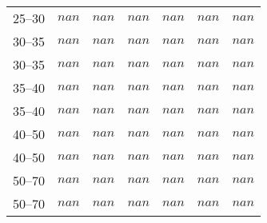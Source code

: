\documentclass{article}
\begin{document}
\begin{table}[!h]
\begin{tabular}{|c|cccccc|}
25--30   &  $nan$  & $nan$  &  $nan$ &  $nan$  & $nan$  &  $nan$ \\
30--35   &  $nan$  & $nan$  &  $nan$ &  $nan$  & $nan$  &  $nan$ \\
30--35   &  $nan$  & $nan$  &  $nan$ &  $nan$  & $nan$  &  $nan$ \\
35--40   &  $nan$  & $nan$  &  $nan$ &  $nan$  & $nan$  &  $nan$ \\
35--40   &  $nan$  & $nan$  &  $nan$ &  $nan$  & $nan$  &  $nan$ \\
40--50   &  $nan$  & $nan$  &  $nan$ &  $nan$  & $nan$  &  $nan$ \\
40--50   &  $nan$  & $nan$  &  $nan$ &  $nan$  & $nan$  &  $nan$ \\
50--70   &  $nan$  & $nan$  &  $nan$ &  $nan$  & $nan$  &  $nan$ \\
50--70   &  $nan$  & $nan$  &  $nan$ &  $nan$  & $nan$  &  $nan$ \\
\hline
\end{tabular}
\label{tab:syst_acceptance}
\end{table}
\end{document}
